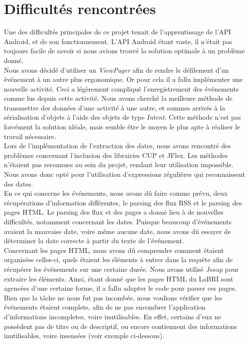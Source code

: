 \chapter{Difficultés rencontrées}

Une des difficultés principales de ce projet tenait de l’apprentissage de l’API Android, et de son fonctionnement. L’API Android étant vaste, il n’était pas toujours facile de savoir si nous avions trouvé la solution optimale à un problème donné.\\
Nous avons décidé d'utiliser un \emph{ViewPager} afin de rendre le défilement d’un événement à un autre plus ergonomique. Or pour cela il a fallu implémenter une nouvelle activité. Ceci a légèrement compliqué l'enregistrement des événements comme lus depuis cette activité. Nous avons cherché la meilleure méthode de transmettre des données d’une activité à une autre, et sommes arrivés à la sérialisation d’objets à l'aide des objets de type \emph{Intent}. Cette méthode n'est pas forcément la solution idéale, mais semble être le moyen le plus apte à réaliser le travail nécessaire. \\

Lors de l’implémentation de l’extraction des dates, nous avons rencontré des problèmes concernant l’inclusion des librairies CUP et JFlex. Les méthodes n’étaient pas reconnues au sein du projet, rendant leur utilisation impossible.
Nous avons donc opté pour l'utilisation d'expressions régulières qui reconnaissent des dates. \\

En ce qui concerne les événements, nous avons dû faire comme prévu, deux récupérations d’information différentes, le parsing des flux RSS et le parsing des pages HTML.
Le parsing des flux et des pages a donné lieu à de nouvelles difficultés, notamment concernant les dates. Puisque beaucoup d'événements avaient la mauvaise date, voire même aucune date, nous avons dû essayer de déterminer la date correcte à partir du texte de l'événement. \\

Concernant les pages HTML, nous avons dû comprendre comment étaient organisées celles-ci, quels étaient les éléments à entrer dans la requête afin de récupérer les événements sur une certaine durée. Nous avons utilisé \emph{Jsoup} pour extraire les éléments. Ainsi, étant donné que les pages HTML du LaBRI sont agencées d'une certaine forme, il a fallu adapter le code pour parser ces pages.
Bien que la tâche ne nous fut pas incombée, nous voulions vérifier que les événements étaient complets, afin de ne pas encombrer l'application d'informations incompletes, voire inutilisables. En effet, certains d’eux ne possèdent pas de titre ou de descriptif, ou encore contiennent des informations inutilisables, voire insensées (voir exemple ci-dessous).


